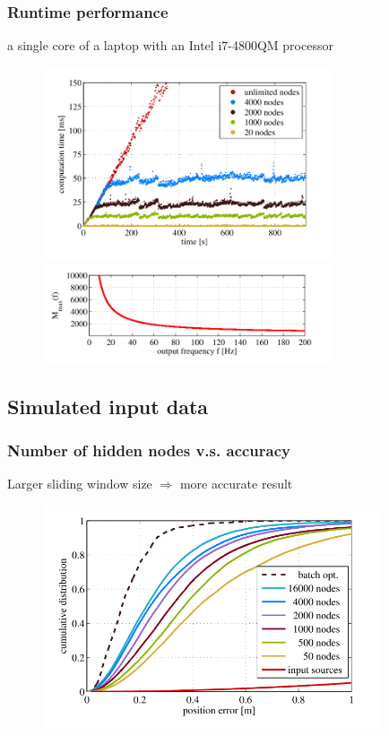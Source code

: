 \documentclass[letterpaper,11pt]{article}
\begin{document}
\subsubsection{Runtime performance}
a single core of a laptop with an Intel i7-4800QM processor
\begin{figure}[!ht]
	\centering
	\includegraphics[width=8.5cm]{./img/runtime.png}
	\includegraphics[width=8.5cm]{./img/relationship.png}
\end{figure}

\subsection{Simulated input data}

\subsubsection{Number of hidden nodes v.s. accuracy}
Larger sliding window size $\Rightarrow$ more accurate result
\begin{figure}[!ht]
	\centering
	\includegraphics[width=10cm]{./img/accuracy.png}
\end{figure}
\end{document}
